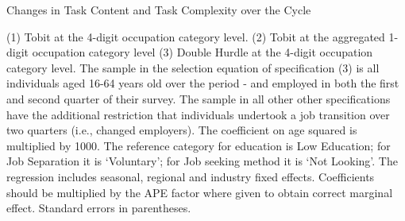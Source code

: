\documentclass[12pt,authoryear]{elsarticle}
\begin{document}
	
		\newpage
	\thispagestyle{empty}
	\begin{table}[htbp]
		\centering
		\caption{Changes in Task Content and Task Complexity over the Cycle}\label{tab:ProbitResults}
		\begin{adjustbox}{width=0.5\textwidth}
			\begin{threeparttable}
				
				
				\begin{tablenotes}
					\item{\footnotesize{(1) Tobit at the 4-digit occupation category level. (2) Tobit at the aggregated 1-digit occupation category level (3) Double Hurdle at the 4-digit occupation category level. The sample in the selection equation of specification (3) is all individuals aged 16-64 years old over the period \hspace{-1mm}-\hspace{-1mm} and employed in both the first and second quarter of their survey. The sample in all other other specifications have the additional restriction that individuals undertook a job transition over two quarters (i.e., changed employers). The coefficient on age squared is multiplied by 1000. The reference category for education is Low Education; for Job Separation it is `Voluntary';  for Job seeking method it is `Not Looking'. The regression includes seasonal, regional and industry fixed effects. Coefficients should be  multiplied by the APE factor where given to obtain correct marginal effect. Standard errors in parentheses.}}
				\end{tablenotes}
			\end{threeparttable}
		\end{adjustbox}
	\end{table}
	\restoregeometry %
	\newpage
	
\end{document}
